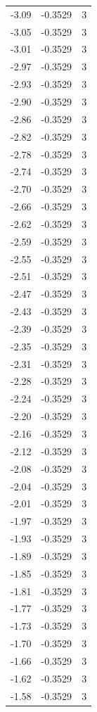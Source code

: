 \begin{longtable}{lrr}
  -3.09 & -0.3529 & 3 \\
  -3.05 & -0.3529 & 3 \\
  -3.01 & -0.3529 & 3 \\
  -2.97 & -0.3529 & 3 \\
  -2.93 & -0.3529 & 3 \\
  -2.90 & -0.3529 & 3 \\
  -2.86 & -0.3529 & 3 \\
  -2.82 & -0.3529 & 3 \\
  -2.78 & -0.3529 & 3 \\
  -2.74 & -0.3529 & 3 \\
  -2.70 & -0.3529 & 3 \\
  -2.66 & -0.3529 & 3 \\
  -2.62 & -0.3529 & 3 \\
  -2.59 & -0.3529 & 3 \\
  -2.55 & -0.3529 & 3 \\
  -2.51 & -0.3529 & 3 \\
  -2.47 & -0.3529 & 3 \\
  -2.43 & -0.3529 & 3 \\
  -2.39 & -0.3529 & 3 \\
  -2.35 & -0.3529 & 3 \\
  -2.31 & -0.3529 & 3 \\
  -2.28 & -0.3529 & 3 \\
  -2.24 & -0.3529 & 3 \\
  -2.20 & -0.3529 & 3 \\
  -2.16 & -0.3529 & 3 \\
  -2.12 & -0.3529 & 3 \\
  -2.08 & -0.3529 & 3 \\
  -2.04 & -0.3529 & 3 \\
  -2.01 & -0.3529 & 3 \\
  -1.97 & -0.3529 & 3 \\
  -1.93 & -0.3529 & 3 \\
  -1.89 & -0.3529 & 3 \\
  -1.85 & -0.3529 & 3 \\
  -1.81 & -0.3529 & 3 \\
  -1.77 & -0.3529 & 3 \\
  -1.73 & -0.3529 & 3 \\
  -1.70 & -0.3529 & 3 \\
  -1.66 & -0.3529 & 3 \\
  -1.62 & -0.3529 & 3 \\
  -1.58 & -0.3529 & 3 \\

\end{longtable}
